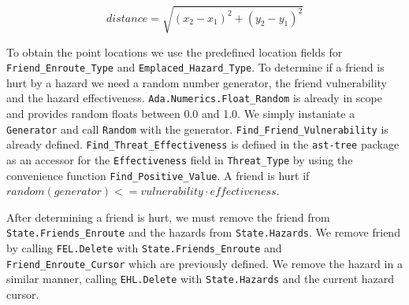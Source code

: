 \documentclass[12pt,letterpaper,titlepage]{article}
\newcommand{\code}[1]{\texttt{#1}}
\begin{document}
\[distance = \sqrt{(x_2-x_1)^2 + (y_2-y_1)^2}\]

To obtain the point locations we use the predefined location fields
for \code{Friend_Enroute_Type} and \code{Emplaced_Hazard_Type}.  To
determine if a friend is hurt by a hazard we need a random number
generator, the friend vulnerability and the hazard effectiveness.
\code{Ada.Numerics.Float_Random} is already in scope and provides
random floats between 0.0 and 1.0.  We simply instaniate a
\code{Generator} and call \code{Random} with the
generator. \code{Find_Friend_Vulnerability} is already defined.
\code{Find_Threat_Effectiveness} is defined in the \code{ast-tree}
package as an accessor for the \code{Effectiveness} field in
\code{Threat_Type} by using the convenience function
\code{Find_Positive_Value}.  A friend is hurt if $random(generator) <=
vulnerability \cdot effectiveness$.

After determining a friend is hurt, we must remove the friend from
\code{State.Friends_Enroute} and the hazards from
\code{State.Hazards}.  We remove friend by calling \code{FEL.Delete}
with \code{State.Friends_Enroute} and \code{Friend_Enroute_Cursor}
which are previously defined.  We remove the hazard in a similar
manner, calling \code{EHL.Delete} with \code{State.Hazards} and the
current hazard cursor.
\end{document}
